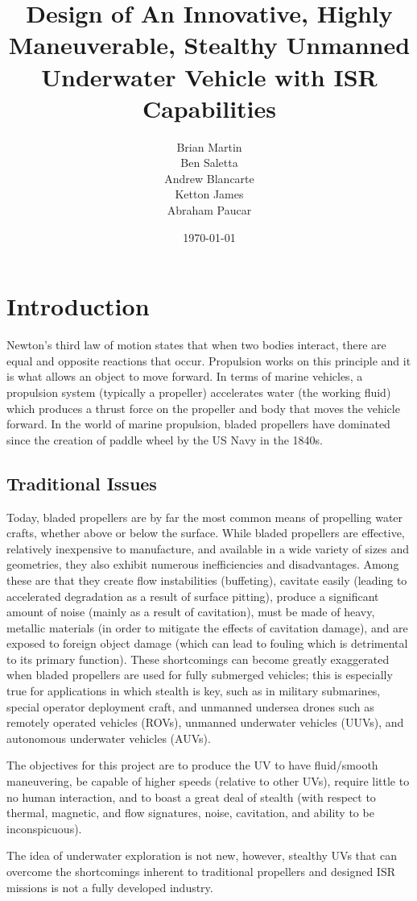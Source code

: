 \documentclass{report}
\title{Design of An Innovative, Highly Maneuverable, Stealthy Unmanned Underwater Vehicle with ISR Capabilities }
\author{Brian Martin\\ Ben Saletta\\Andrew Blancarte\\ Ketton James\\Abraham Paucar}
\date{\today}
\begin{document}
\maketitle
\tableofcontents
\listoffigures
\newpage
\section{Introduction}
Newton’s third law of motion states that when two bodies interact, there are equal and opposite reactions that occur. Propulsion works on this principle and it is what allows an object to move forward. In terms of marine vehicles, a propulsion system (typically a propeller) accelerates water (the working fluid) which produces a thrust force on the propeller and body that moves the vehicle forward. In the world of marine propulsion, bladed propellers have dominated since the creation of paddle wheel by the US Navy in the 1840s.\par
\subsection{Traditional Issues}
Today, bladed propellers are by far the most common means of propelling water crafts, whether above or below the surface. While bladed propellers are effective, relatively inexpensive to manufacture, and available in a wide variety of sizes and geometries, they also exhibit numerous inefficiencies and disadvantages.  Among these are that they create flow instabilities (buffeting), cavitate easily (leading to accelerated degradation as a result of surface pitting), produce a significant amount of noise (mainly as a result of cavitation), must be made of heavy, metallic materials (in order to mitigate the effects of cavitation damage), and are exposed to foreign object damage (which can lead to fouling which is detrimental to its primary function). These shortcomings can become greatly exaggerated when bladed propellers are used for fully submerged vehicles; this is especially true for applications in which stealth is key, such as in military submarines, special operator deployment craft, and unmanned undersea drones such as remotely operated vehicles (ROVs), unmanned underwater vehicles (UUVs), and autonomous underwater vehicles (AUVs).  \par
The objectives for this project are to produce the UV to have fluid/smooth maneuvering, be capable of higher speeds (relative to other UVs), require little to no human interaction, and to boast a great deal of stealth (with respect to thermal, magnetic, and flow signatures, noise, cavitation, and ability to be inconspicuous).\par
The idea of underwater exploration is not new, however, stealthy UVs that can overcome the shortcomings inherent to traditional propellers and designed ISR missions is not a fully developed industry.\par
\end{document}
